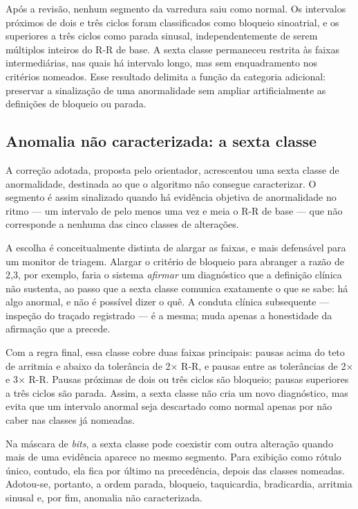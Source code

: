 Após a revisão, nenhum segmento da varredura saiu como normal. Os intervalos próximos de dois e três ciclos foram classificados como bloqueio sinoatrial, e os superiores a três ciclos como parada sinusal, independentemente de serem múltiplos inteiros do R-R de base. A sexta classe permaneceu restrita às faixas intermediárias, nas quais há intervalo longo, mas sem enquadramento nos critérios nomeados. Esse resultado delimita a função da categoria adicional: preservar a sinalização de uma anormalidade sem ampliar artificialmente as definições de bloqueio ou parada.

\subsection{Anomalia não caracterizada: a sexta classe}
\label{sec:resNaoCaracterizada}

A correção adotada, proposta pelo orientador, acrescentou uma sexta classe de anormalidade, destinada ao que o algoritmo não consegue caracterizar. O segmento é assim sinalizado quando há evidência objetiva de anormalidade no ritmo --- um intervalo de pelo menos uma vez e meia o R-R de base --- que não corresponde a nenhuma das cinco classes de alterações.

A escolha é conceitualmente distinta de alargar as faixas, e mais defensável para um monitor de triagem. Alargar o critério de bloqueio para abranger a razão de 2,3, por exemplo, faria o sistema \emph{afirmar} um diagnóstico que a definição clínica não sustenta, ao passo que a sexta classe comunica exatamente o que se sabe: há algo anormal, e não é possível dizer o quê. A conduta clínica subsequente --- inspeção do traçado registrado --- é a mesma; muda apenas a honestidade da afirmação que a precede.

Com a regra final, essa classe cobre duas faixas principais: pausas acima do teto de arritmia e abaixo da tolerância de 2$\times$ R-R, e pausas entre as tolerâncias de 2$\times$ e 3$\times$ R-R. Pausas próximas de dois ou três ciclos são bloqueio; pausas superiores a três ciclos são parada. Assim, a sexta classe não cria um novo diagnóstico, mas evita que um intervalo anormal seja descartado como normal apenas por não caber nas classes já nomeadas.

Na máscara de \textit{bits}, a sexta classe pode coexistir com outra alteração quando mais de uma evidência aparece no mesmo segmento. Para exibição como rótulo único, contudo, ela fica por último na precedência, depois das classes nomeadas. Adotou-se, portanto, a ordem parada, bloqueio, taquicardia, bradicardia, arritmia sinusal e, por fim, anomalia não caracterizada.


